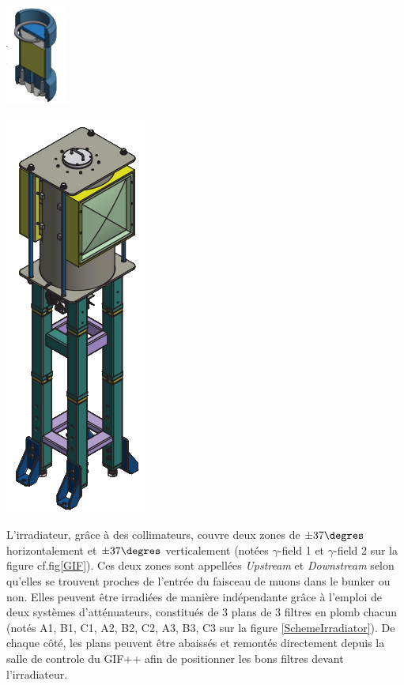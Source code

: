 \marginpar
{
	\centering
	\includegraphics[width=0.5\marginparwidth]{GLA/Source.png}
	\label{Source}
}

\marginpar
{
	\centering
	\includegraphics[width=0.5\marginparwidth]{GLA/Irradiateur.png}
	\label{Irradiateur}
}

L'irradiateur, grâce à des collimateurs, couvre deux zones de $\pm37\degres$ horizontalement et $\pm37\degres$ verticalement (notées $\gamma$-field 1 et $\gamma$-field 2 sur la figure cf.fig\ref{GIF}). Ces deux zones sont appellées \textit{Upstream} et \textit{Downstream} selon qu'elles se trouvent proches de l'entrée du faisceau de muons dans le bunker ou non. Elles peuvent être irradiées de manière indépendante grâce à l'emploi de deux systèmes d'atténuateurs, constitués de 3 plans de 3 filtres en plomb chacun (notés A1, B1, C1, A2, B2, C2, A3, B3, C3 sur la figure \ref{SchemeIrradiator}). De chaque côté, les plans peuvent être abaissés et remontés directement depuis la salle de controle du GIF++ afin de positionner les bons filtres devant l'irradiateur.

